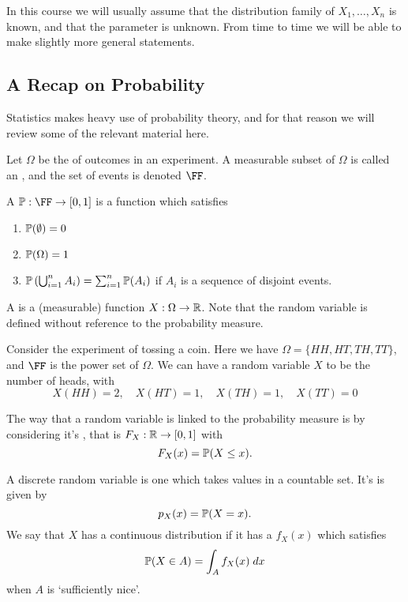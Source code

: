 \documentclass[a4paper]{scrartcl}
\begin{document}
In this course we will usually assume that the distribution family of $X_1, \dots, X_n$ is known, and that the parameter is unknown. From time to time we will be able to make slightly more general statements.

\subsection{A Recap on Probability}

Statistics makes heavy use of probability theory, and for that reason we will review some of the relevant material here.

Let $\Omega$ be the  of outcomes in an experiment. A measurable subset of $\Omega$ is called an , and the set of events is denoted $
\FF$. 

A  $\PP: \FF \rightarrow [0, 1]$ is a function which satisfies
\begin{enumerate}
  \item $\mathbb{P}(\emptyset) = 0$
  \item $\mathbb{P}(\Omega) = 1$
  \item $\mathbb{P}\left(\bigcup_{i = 1}^n A_i\right) = \sum_{i = 1}^n \mathbb{P}(A_i)$ if $A_i$ is a sequence of disjoint events.
\end{enumerate}

A  is a (measurable) function $X : \Omega \rightarrow \mathbb{R}$. 
Note that the random variable is defined without reference to the probability measure.

\begin{example}
  Consider the experiment of tossing a coin. Here we have $\Omega = \{HH, HT, TH, TT\}$, and $\FF$ is the power set of $\Omega$. We can have a random variable $X$ to be the number of heads, with
  $$
  X(HH) = 2, \quad X(HT) = 1, \quad X(TH) = 1, \quad X(TT) = 0
  $$
\end{example}

The way that a random variable is linked to the probability measure is by considering it's , that is $F_X: \mathbb{R} \rightarrow [0, 1]$ with
$$
F_X(x) = \mathbb{P}(X \leq x).
$$

A discrete random variable is one which takes values in a countable set. It's  is given by 
$$p_X(x) = \mathbb{P}(X = x).$$
We say that $X$ has a continuous distribution if it has a  $f_X(x)$ which satisfies
$$
\mathbb{P}(X \in A) = \int_A f_X(x) \; d x
$$
when $A$ is `sufficiently nice'.
\end{document}
